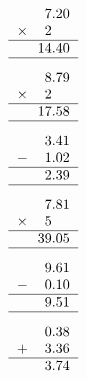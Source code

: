 \documentclass[leqno, 12pt]{article}
\begin{document}
\begin{multicols}{3}
\begin{equation}
    \raisebox{-0.8cm}{
        \begin{tabular}{c S[table-format=1.2]}
         &7.20 \tabularnewline
        $\times$&2 \tabularnewline
        \hline
         &14.40 \tabularnewline
        \hline
    \end{tabular}}
\end{equation}
\vspace{-1pt}%
\begin{equation}
    \raisebox{-0.8cm}{
        \begin{tabular}{c S[table-format=1.2]}
         &8.79 \tabularnewline
        $\times$&2 \tabularnewline
        \hline
         &17.58 \tabularnewline
        \hline
    \end{tabular}}
\end{equation}
\vspace{-1pt}%
\begin{equation}
    \raisebox{-0.8cm}{
        \begin{tabular}{c S[table-format=1.2]}
         &3.41 \tabularnewline
        $-$&1.02 \tabularnewline
        \hline
         &2.39 \tabularnewline
        \hline
    \end{tabular}}
\end{equation}
\vspace{-1pt}%
\begin{equation}
    \raisebox{-0.8cm}{
        \begin{tabular}{c S[table-format=1.2]}
         &7.81 \tabularnewline
        $\times$&5 \tabularnewline
        \hline
         &39.05 \tabularnewline
        \hline
    \end{tabular}}
\end{equation}
\vspace{-1pt}%
\begin{equation}
    \raisebox{-0.8cm}{
        \begin{tabular}{c S[table-format=1.2]}
         &9.61 \tabularnewline
        $-$&0.10 \tabularnewline
        \hline
         &9.51 \tabularnewline
        \hline
    \end{tabular}}
\end{equation}
\vspace{-1pt}%
\begin{equation}
    \raisebox{-0.8cm}{
        \begin{tabular}{c S[table-format=1.2]}
         &0.38 \tabularnewline
        $+$&3.36 \tabularnewline
        \hline
         &3.74 \tabularnewline

\end{tabular}}
\end{equation}
\end{multicols}
\end{document}
